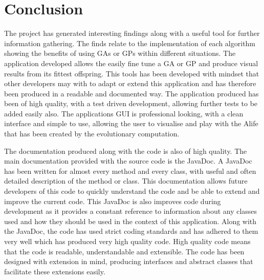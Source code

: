 \documentclass[12pt]{article}
\begin{document}
\section{Conclusion}
The project has generated interesting findings along with a useful tool for further information gathering. The finds relate to the implementation of each algorithm
showing the benefits of using GAs or GPs within different situations. The application developed allows the easily fine tune a GA or GP and produce visual results 
from its fittest offspring. This tools has been developed with mindset that other developers may with to adapt or extend this application and has therefore
been produced in a readable and documented way. The application produced has been of high quality, with a test driven development, allowing further tests to be
added easily also. The applications GUI is professional looking, with a clean interface and simple to use, allowing the user to visualise and play with the 
Alife that has been created by the evolutionary computation.

The documentation produced along with the code is also of high quality. The main documentation provided with the source code is the JavaDoc. A JavaDoc has been 
written for almost every method and every class, with useful and often detailed description of the method or class. This documentation allows future developers
of this code to quickly understand the code and be able to extend and improve the current code. This JavaDoc is also improves code during development as it 
provides a constant reference to information about any classes used and how they should be used in the context of this application. 
Along with the JavaDoc, the code has used strict coding standards and has adhered to them very well which has produced very high quality code. High quality code
means that the code is readable, understandable and extensible. The code has been designed with extension in mind, producing interfaces and abstract classes
that facilitate these extensions easily.
\end{document}
